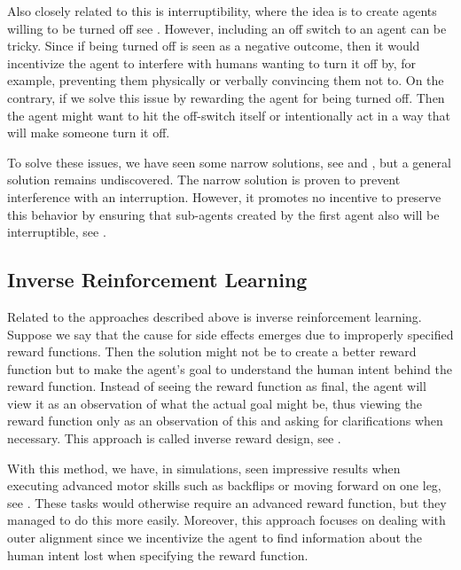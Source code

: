 \documentclass[12pt,A4]{report}
\theoremstyle{definition}
\begin{document}
Also closely related to this is interruptibility, where the idea is to create agents willing to be turned off see \citet{Interruptible}. However, including an off switch to an agent can be tricky. Since if being turned off is seen as a negative outcome, then it would incentivize the agent to interfere with humans wanting to turn it off by, for example, preventing them physically or verbally convincing them not to. On the contrary, if we solve this issue by rewarding the agent for being turned off. Then the agent might want to hit the off-switch itself or intentionally act in a way that will make someone turn it off. 

To solve these issues, we have seen some narrow solutions, see \citet{Hadfield-Menell} and \citet{Carey}, but a general solution remains undiscovered. The narrow solution is proven to prevent interference with an interruption. However, it promotes no incentive to preserve this behavior by ensuring that sub-agents created by the first agent also will be interruptible, see \citet{co-founding}.  

\subsection{Inverse Reinforcement Learning}
Related to the approaches described above is inverse reinforcement learning. Suppose we say that the cause for side effects emerges due to improperly specified reward functions. Then the solution might not be to create a better reward function but to make the agent's goal to understand the human intent behind the reward function. Instead of seeing the reward function as final, the agent will view it as an observation of what the actual goal might be, thus viewing the reward function only as an observation of this and asking for clarifications when necessary. This approach is called inverse reward design, see \citet{Hadfield-Menell2}.

With this method, we have, in simulations, seen impressive results when executing advanced motor skills such as backflips or moving forward on one leg, see \citet{Christiano}. These tasks would otherwise require an advanced reward function, but they managed to do this more easily. Moreover, this approach focuses on dealing with outer alignment since we incentivize the agent to find information about the human intent lost when specifying the reward function. 
\end{document}
